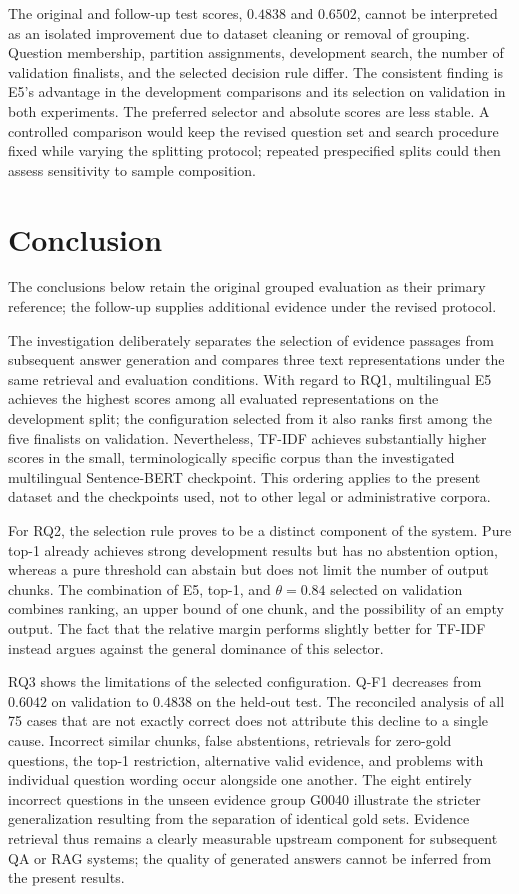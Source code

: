 \documentclass[11pt]{article}
\newcommand{\revision}[1]{#1}
\begin{document}
\revision{The original and follow-up test scores, $0.4838$ and $0.6502$, cannot be interpreted as an isolated improvement due to dataset cleaning or removal of grouping. Question membership, partition assignments, development search, the number of validation finalists, and the selected decision rule differ. The consistent finding is E5's advantage in the development comparisons and its selection on validation in both experiments. The preferred selector and absolute scores are less stable. A controlled comparison would keep the revised question set and search procedure fixed while varying the splitting protocol; repeated prespecified splits could then assess sensitivity to sample composition.}


\section{Conclusion}

\revision{The conclusions below retain the original grouped evaluation as their primary reference; the follow-up supplies additional evidence under the revised protocol.}

The investigation deliberately separates the selection of evidence passages from subsequent answer generation and compares three text representations under the same retrieval and evaluation conditions. With regard to RQ1, multilingual E5 achieves the highest scores among all evaluated representations on the development split; the configuration selected from it also ranks first among the five finalists on validation. Nevertheless, TF-IDF achieves substantially higher scores in the small, terminologically specific corpus than the investigated multilingual Sentence-BERT checkpoint. This ordering applies to the present dataset and the checkpoints used, not to other legal or administrative corpora.

For RQ2, the selection rule proves to be a distinct component of the system. Pure top-1 already achieves strong development results but has no abstention option, whereas a pure threshold can abstain but does not limit the number of output chunks. The combination of E5, top-1, and $\theta=0.84$ selected on validation combines ranking, an upper bound of one chunk, and the possibility of an empty output. The fact that the relative margin performs slightly better for TF-IDF instead argues against the general dominance of this selector.

RQ3 shows the limitations of the selected configuration. Q-F1 decreases from $0.6042$ on validation to $0.4838$ on the held-out test. The reconciled analysis of all 75 cases that are not exactly correct does not attribute this decline to a single cause. Incorrect similar chunks, false abstentions, retrievals for zero-gold questions, the top-1 restriction, alternative valid evidence, and problems with individual question wording occur alongside one another. The eight entirely incorrect questions in the unseen evidence group G0040 illustrate the stricter generalization resulting from the separation of identical gold sets. Evidence retrieval thus remains a clearly measurable upstream component for subsequent QA or RAG systems; the quality of generated answers cannot be inferred from the present results.
\end{document}
